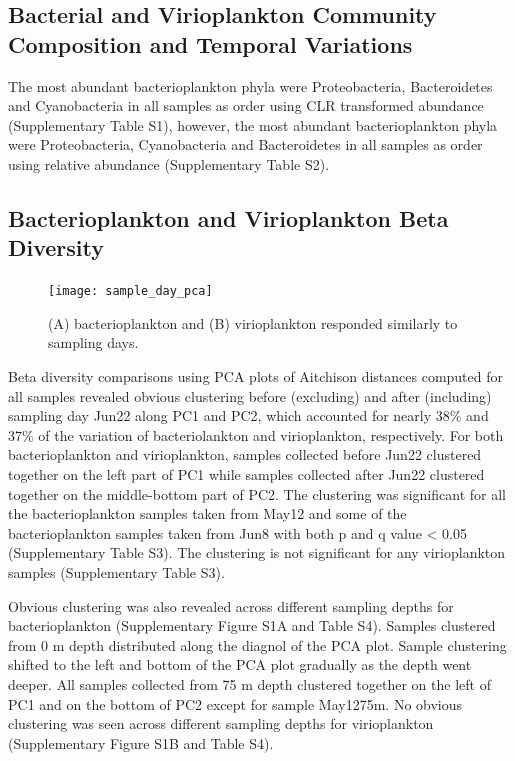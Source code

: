 \documentclass[a4,center,fleqn]{NAR}
\begin{document}
\subsection{Bacterial and Virioplankton Community Composition and Temporal Variations}

The most abundant bacterioplankton phyla were Proteobacteria,  Bacteroidetes and Cyanobacteria in all samples as order using CLR transformed abundance (Supplementary Table S1), however, the most abundant bacterioplankton phyla were Proteobacteria, Cyanobacteria and Bacteroidetes in all samples as order using relative abundance (Supplementary Table S2).

\subsection{Bacterioplankton and Virioplankton Beta Diversity}

\begin{figure}[t]
\begin{center}
\texttt{[image: sample\_day\_pca]}
\end{center}
\caption{(A) bacterioplankton and (B) virioplankton responded similarly to sampling days.
}
\label{bata_div}
\end{figure}

Beta diversity comparisons using PCA plots of Aitchison distances computed for all samples revealed obvious clustering before (excluding) and after (including) sampling day Jun22 along PC1 and PC2, which accounted for nearly 38\%  and 37\% of the variation of bacteriolankton and virioplankton, respectively.
For both bacterioplankton and virioplankton, samples collected before Jun22 clustered together on the left part of PC1 while samples collected after Jun22 clustered together on the middle-bottom part of PC2.
The clustering was significant for all the bacterioplankton samples taken from May12 and some of the bacterioplankton samples taken from Jun8 with both p and q value < 0.05 (Supplementary Table S3).
The clustering is not significant for any virioplankton samples (Supplementary Table S3).

Obvious clustering was also revealed across different sampling depths for bacterioplankton (Supplementary Figure S1A and Table S4). 
Samples clustered from 0 m depth distributed along the diagnol of the PCA plot.
Sample clustering shifted to the left and bottom of the PCA plot gradually as the depth went deeper.
All samples collected from 75 m depth clustered together on the left of PC1 and on the bottom of PC2 except for sample May12\textunderscore75m. 
No obvious clustering was seen across different sampling depths for virioplankton (Supplementary Figure S1B and Table S4).
\end{document}
